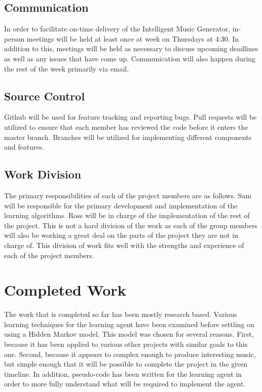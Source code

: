 \documentclass{article}
\begin{document}
\subsection{Communication}
In order to facilitate on-time delivery of the Intelligent Music Generator, in-person meetings will be held at least once at week on Thursdays at 4:30. In addition to this, meetings will be held as necessary to discuss upcoming deadlines as well as any issues that have come up. Communication will also happen during the rest of the week primarily via email.

\subsection{Source Control}
Github will be used for feature tracking and reporting bugs.  Pull requests will be utilized to ensure that each member has reviewed the code before it enters the master branch.  Branches will be utilized for implementing different components and features.

\subsection{Work Division}
The primary responsibilities of each of the project members are as follows. Sam will be responsible for the primary development and implementation of the learning algorithms. Ross will be in charge of the implementation of the rest of the project. This is not a hard division of the work as each of the group members will also be working a great deal on the parts of the project they are not in charge of. This division of work fits well with the strengths and experience of each of the project members.

\section{Completed Work}
The work that is completed so far has been mostly research based. Various learning techniques for the learning agent have been examined before settling on using a Hidden Markov model. This model was chosen for several reasons. First, because it has been applied to various other projects with similar goals to this one. Second, because it appears to complex enough to produce interesting music, but simple enough that it will be possible to complete the project in the given timeline. In addition, pseudo-code has been written for the learning agent in order to more fully understand what will be required to implement the agent.
\end{document}
